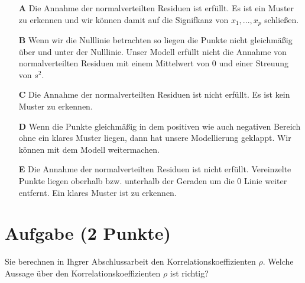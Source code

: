 \documentclass[a4paper, 9pt]{scrartcl}\usepackage[]{graphicx}\usepackage[]{xcolor}
\begin{document}
\begin{enumerate}
\item [\textbf{A} \msquare] Die Annahme der normalverteilten Residuen ist erfüllt. Es ist ein Muster zu erkennen und wir können damit auf die Signifkanz von $x_1, ..., x_p$ schließen.
\item [\textbf{B} \msquare] Wenn wir die Nulllinie betrachten so liegen die Punkte nicht gleichmäßig über und unter der Nulllinie. Unser Modell erfüllt nicht die Annahme von normalverteilten Residuen mit einem Mittelwert von 0 und einer Streuung von $s^2$.
\item [\textbf{C} \msquare] Die Annahme der normalverteilten Residuen ist nicht erfüllt. Es ist kein Muster zu erkennen.
\item [\textbf{D} \msquare] Wenn die Punkte gleichmäßig in dem positiven wie auch negativen Bereich ohne ein klares Muster liegen, dann hat unsere Modellierung geklappt. Wir können mit dem Modell weitermachen.
\item [\textbf{E} \msquare] Die Annahme der normalverteilten Residuen ist nicht erfüllt. Vereinzelte Punkte liegen oberhalb bzw. unterhalb der Geraden um die 0 Linie weiter entfernt. Ein klares Muster ist zu erkennen.
\end{enumerate}

\section{Aufgabe \hfill (2 Punkte)}




Sie berechnen in Ihgrer Abschlussarbeit den Korrelationskoeffizienten $\rho$. Welche Aussage über den Korrelationskoeffizienten $\rho$ ist richtig?
\end{document}
